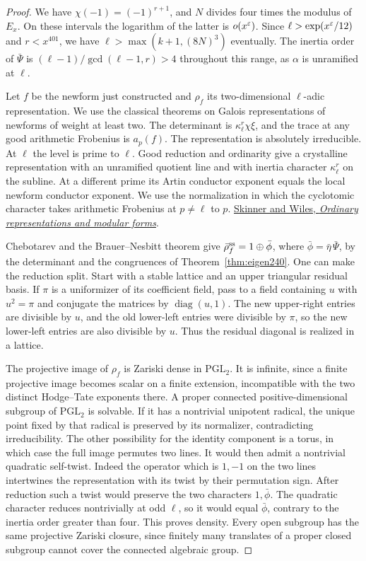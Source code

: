 \documentclass[a4paper,11pt]{article}
\theoremstyle{definition}
\theoremstyle{remark}
\numberwithin{equation}{section}
\begin{document}
\begin{proof}
We have \(\chi(-1)=(-1)^{r+1}\), and \(N\) divides four times
the modulus of \(E_x\). On these intervals the logarithm of
the latter is \(o(x^\varepsilon)\). Since \(\ell>\exp(x^\varepsilon/12)\)
and \(r<x^{401}\), we have \(\ell>\max(k+1,(8N)^3)\) eventually.
The inertia order of \(\bar\Psi\) is
\((\ell-1)/\gcd(\ell-1,r)>4\) throughout this range, as
\(\alpha\) is unramified at \(\ell\).

Let \(f\) be the newform just constructed and \(\rho_f\) its
two-dimensional \(\ell\)-adic representation. We use the
classical theorems on Galois representations of newforms of
weight at least two. The determinant is
\(\kappa_\ell^r\chi\xi\), and the trace at any good arithmetic
Frobenius is \(a_p(f)\). The representation is absolutely
irreducible. At \(\ell\) the level is prime to \(\ell\).
Good reduction and ordinarity give a crystalline representation
with an unramified quotient line and with inertia character
\(\kappa_\ell^r\) on the subline. At a different prime its
Artin conductor exponent equals the local newform conductor
exponent. We use the normalization in which the cyclotomic
character takes arithmetic Frobenius at \(p\ne\ell\) to \(p\).
\cite{VI-IV-VI-carayol117,VI-IV-I-compat123}
\href{https://doi.org/10.1073/pnas.94.20.10520}{Skinner and
Wiles, \emph{Ordinary representations and modular forms}}.

Chebotarev and the Brauer--Nesbitt theorem give
\(\bar\rho_f^{\rm ss}=1\oplus\bar\phi\), where
\(\bar\phi=\bar\eta\,\bar\Psi\), by the determinant and the
congruences of Theorem~\ref{thm:eigen240}. One can make the
reduction split. Start with a stable lattice and an upper
triangular residual basis. If \(\pi\) is a uniformizer of
its coefficient field, pass to a field containing \(u\) with
\(u^2=\pi\) and conjugate the matrices by
\(\operatorname{diag}(u,1)\). The new upper-right entries are
divisible by \(u\), and the old lower-left entries were divisible
by \(\pi\), so the new lower-left entries are also divisible
by \(u\). Thus the residual diagonal is realized in a lattice.

The projective image of \(\rho_f\) is Zariski dense in
\(\mathrm{PGL}_2\). It is infinite, since a finite projective
image becomes scalar on a finite extension, incompatible with
the two distinct Hodge--Tate exponents there. A proper connected
positive-dimensional subgroup of \(\mathrm{PGL}_2\) is solvable.
If it has a nontrivial unipotent radical, the unique point fixed
by that radical is preserved by its normalizer, contradicting
irreducibility. The other possibility for the identity component
is a torus, in which case the full image permutes two lines.
It would then admit a nontrivial quadratic self-twist. Indeed
the operator which is \(1,-1\) on the two lines intertwines the
representation with its twist by their permutation sign.
After reduction such a twist would preserve the two characters
\(1,\bar\phi\). The quadratic character reduces nontrivially
at odd \(\ell\), so it would equal \(\bar\phi\), contrary to
the inertia order greater than four. This proves density.
Every open subgroup has the same projective Zariski closure,
since finitely many translates of a proper closed subgroup
cannot cover the connected algebraic group.


\end{proof}
\end{document}
